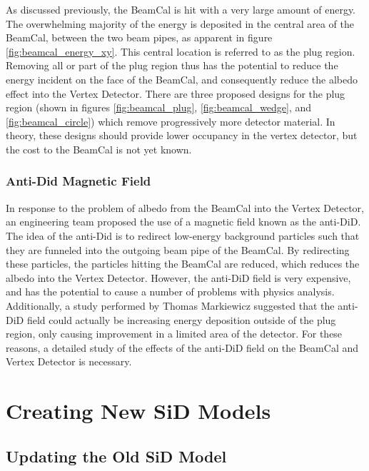 \documentclass{report}
\begin{document}
                As discussed previously, the BeamCal is hit with a very large amount of energy. The overwhelming majority of the energy is deposited in the central area of the BeamCal, between the two beam pipes, as apparent in figure \ref{fig:beamcal_energy_xy}. This central location is referred to as the plug region. Removing all or part of the plug region thus has the potential to reduce the energy incident on the face of the BeamCal, and consequently reduce the albedo effect into the Vertex Detector. There are three proposed designs for the plug region (shown in figures \ref{fig:beamcal_plug}, \ref{fig:beamcal_wedge}, and \ref{fig:beamcal_circle}) which remove progressively more detector material. In theory, these designs should provide lower occupancy in the vertex detector, but the cost to the BeamCal is not yet known.


            \subsection{Anti-Did Magnetic Field}
                In response to the problem of albedo from the BeamCal into the Vertex Detector, an engineering team proposed the use of a magnetic field known as the anti-DiD. The idea of the anti-Did is to redirect low-energy background particles such that they are funneled into the outgoing beam pipe of the BeamCal. By redirecting these particles, the particles hitting the BeamCal are reduced, which reduces the albedo into the Vertex Detector. However, the anti-DiD field is very expensive, and has the potential to cause a number of problems with physics analysis. Additionally, a study performed by Thomas Markiewicz \cite{anti-did} suggested that the anti-DiD field could actually be increasing energy deposition outside of the plug region, only causing improvement in a limited area of the detector. For these reasons, a detailed study of the effects of the anti-DiD field on the BeamCal and Vertex Detector is necessary.





    \chapter{Creating New SiD Models}
        \section{Updating the Old SiD Model}
            
\end{document}
